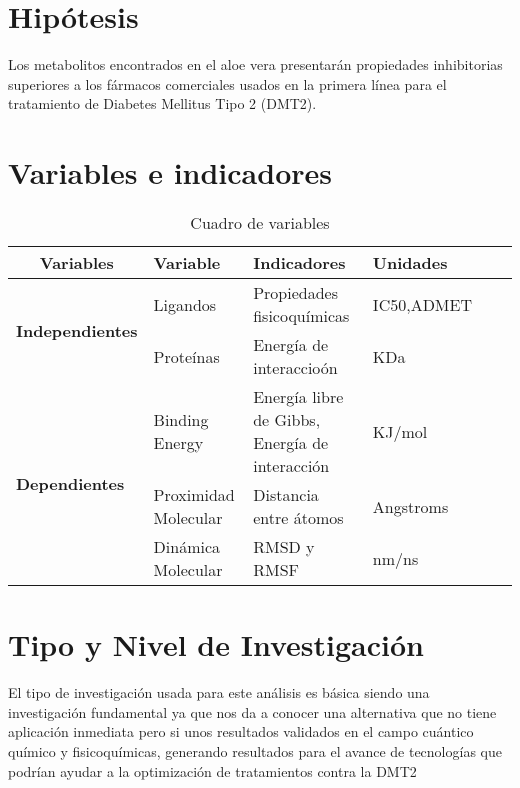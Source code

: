 \section{Hipótesis}
Los metabolitos encontrados en el aloe vera presentarán propiedades inhibitorias superiores a los fármacos comerciales usados en la primera línea para el tratamiento de Diabetes Mellitus Tipo 2 (DMT2).  


\section{Variables e indicadores}

 \begin{table}[htbp]
 \caption{Cuadro de variables}\label{t1}
  \begin{tabular}{llcp{3.5cm}p{3.5cm}p{3.5cm}cp{3.5cm}}
  \hline
  \multicolumn{3}{c}{\textbf{Variables}}                       & \textbf{Variable}      & \textbf{Indicadores}                 & \textbf{Unidades} \\ \hline
  \multicolumn{3}{c}{\multirow{2}{*}{\textbf{Independientes}}} 
  & Ligandos & Propiedades fisicoquímicas & IC50,ADMET\\ \cline{4-6} 
  \multicolumn{3}{c}{}                                         &Proteínas  & Energía de interaccioón  & KDa \\ \hline
  \multicolumn{3}{l}{\multirow{3}{*}{\textbf{Dependientes}}}   &Binding Energy   &Energía libre de Gibbs, Energía de interacción   & KJ/mol \\ \cline{4-6} 
  \multicolumn{3}{l}{}                                         &Proximidad Molecular   &Distancia entre átomos   &Angstroms \\ \cline{4-6} 
  \multicolumn{3}{l}{}                                         &Dinámica Molecular   &RMSD y RMSF   &nm/ns \\ \hline 
  \end{tabular}
\end{table}

\section{Tipo y Nivel de Investigación}
El tipo de investigación usada para este análisis es básica siendo una investigación fundamental ya que nos da a conocer una alternativa que no tiene aplicación inmediata pero si unos resultados validados en el campo cuántico químico y fisicoquímicas, generando resultados para el avance de tecnologías que podrían ayudar a la optimización de tratamientos contra la DMT2  


